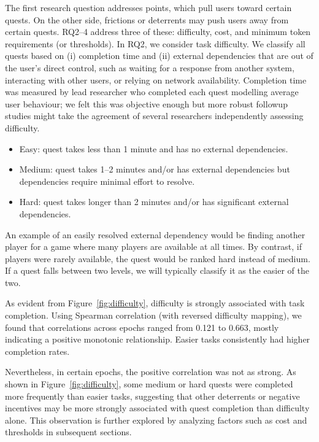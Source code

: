 The first research question addresses points, which pull users toward certain quests. On the other side, frictions or deterrents may push users away from certain quests. RQ2--4 address three of these: difficulty, cost, and minimum token requirements (or thresholds). In RQ2, we consider task difficulty. We classify all quests based on (i) completion time and (ii) external dependencies that are out of the user's direct control, such as waiting for a response from another system, interacting with other users, or relying on network availability. Completion time was measured by lead researcher who completed each quest modelling average user behaviour; we felt this was objective enough but more robust followup studies might take the agreement of several researchers independently assessing difficulty.

\begin{itemize}
\item Easy: quest takes less than 1 minute and has no external dependencies.
\item Medium: quest takes 1--2 minutes and/or has external dependencies but dependencies require minimal effort to resolve.
\item Hard: quest takes longer than 2 minutes and/or has significant external dependencies.
\end{itemize}

An example of an easily resolved external dependency would be finding another player for a game where many players are available at all times. By contrast, if players were rarely available, the quest would be ranked hard instead of medium. If a quest falls between two levels, we will typically classify it as the easier of the two. 

As evident from Figure~\ref{fig:difficulty}, difficulty is strongly associated with task completion. Using Spearman correlation (with reversed difficulty mapping), we found that correlations across epochs ranged from 0.121 to 0.663, mostly indicating a positive monotonic relationship. Easier tasks consistently had higher completion rates. 

Nevertheless, in certain epochs, the positive correlation was not as strong. As shown in Figure~\ref{fig:difficulty}, some medium or hard quests were completed more frequently than easier tasks, suggesting that other deterrents or negative incentives may be more strongly associated with quest completion than difficulty alone. This observation is further explored by analyzing factors such as cost and thresholds in subsequent sections.

